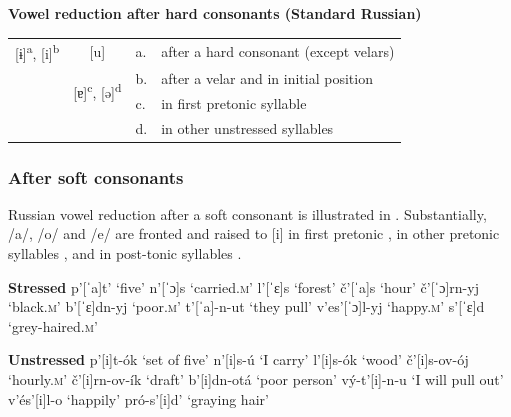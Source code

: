 \documentclass[output=paper,
modfonts,
newtxmath,
hidelinks,
]{langscibook}
\begin{document}
\ea \textbf{Vowel reduction after hard consonants (Standard Russian)}\label{4}\\\medskip
\begin{tabular}{|p{1.7cm}|p{1.7cm}|ll}
\cline{1-2}
\multicolumn{1}{|c|}{[ɨ]\textsuperscript{a}, [i]\textsuperscript{b}}&\multicolumn{1}{|c|}{[u]}&a.&after a hard consonant (except velars)\\\hhline{--~~}
\multicolumn{1}{|c|}{\shadecell}&\multicolumn{1}{|c|}{\multirow{2}{*}{[ɐ]\textsuperscript{c}, [ə]\textsuperscript{d}}}&b.&after a velar and in initial position\\\cline{1-1}
\multicolumn{1}{|p{1.7cm}}{}&&c.&in first pretonic syllable\\\cline{1-2}
\multicolumn{2}{c}{}&d.&in other unstressed syllables\\
\end{tabular}
\z


\subsubsection{After soft consonants}\label{s2.1.2}

Russian vowel reduction after a soft consonant is illustrated in . Substantially, /a/, /o/ and /e/ are fronted and raised to [i] in first pretonic , in other pretonic syllables , and in post-tonic syllables .\vspace{-\baselineskip}

\ea\label{5}\begin{multicols}{2}
\begin{xlist}
\exi{} \textbf{Stressed}
\ex p’[ˈa]t’ \tabto{2.1cm}‘five’\label{5a}
\exi{} n’[ˈɔ]s \tabto{2.1cm}‘carried.\textsc{m}’
\exi{} l’[ˈɛ]s \tabto{2.1cm}‘forest’
\ex č’[ˈa]s \tabto{2.1cm}‘hour’\label{5b}
\exi{} č’[ˈɔ]rn-yj \tabto{2.1cm}‘black.\textsc{m}’
\exi{} b’[ˈɛ]dn-yj \tabto{2.1cm}‘poor.\textsc{m}’
\ex t’[ˈa]-n-ut \tabto{2.1cm}‘they pull’\label{5c}
\exi{} v’es’[ˈɔ]l-yj \tabto{2.1cm}‘happy.\textsc{m}’
\exi{} s’[ˈɛ]d \tabto{2.1cm}‘grey-haired.\textsc{m}’
\end{xlist}\columnbreak
\begin{xlist}
\exi{} \textbf{Unstressed}
\exi{} p’[i]t-ók \tabto{2.1cm}‘set of five’
\exi{} n’[i]s-ú \tabto{2.1cm}‘I carry’
\exi{} l’[i]s-ók \tabto{2.1cm}‘wood’
\exi{} č’[i]s-ov-ój \tabto{2.1cm}‘hourly.\textsc{m}’
\exi{} č’[i]rn-ov-ík \tabto{2.1cm}‘draft’
\exi{} b’[i]dn-otá \tabto{2.1cm}‘poor person’
\exi{} vý-t’[i]-n-u \tabto{2.1cm}‘I will pull out’
\exi{} v’és’[i]l-o \tabto{2.1cm}‘happily’
\exi{} pró-s’[i]d’ \tabto{2.1cm}‘graying hair’
\end{xlist}
\end{multicols}
\z
\end{document}
